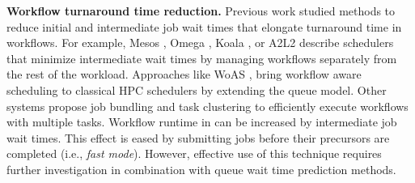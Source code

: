 %


\noindent \textbf{Workflow turnaround time reduction.}
Previous work studied methods to reduce 
initial and intermediate job wait times that 
elongate turnaround time in workflows.
For example, Mesos \cite{hindman2011mesos}, Omega \cite{schwarzkopf2013omega},
Koala \cite{mohamed2008koala}, or A2L2 \cite{rodrigo2015a2l2}
describe schedulers that minimize intermediate wait times
by managing workflows separately from the rest of the workload.
Approaches like WoAS \cite{rodrigo2017enabling},
bring workflow aware scheduling to classical
HPC schedulers
by extending the queue model.  %
Other systems propose job bundling \cite{elastic_job_bundling}
and task clustering \cite{singh2008workflow} to
efficiently execute workflows with multiple tasks.
Workflow runtime in \systemname can be increased by intermediate job
wait times.  This effect is eased by submitting jobs before their
precursors are completed (i.e., \emph{fast mode}).  However, effective
use of this technique requires further investigation in combination
with queue wait time prediction methods.

